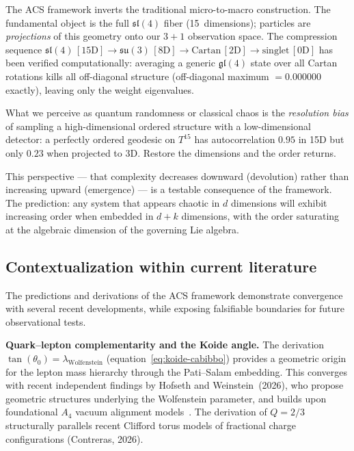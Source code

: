 \documentclass[11pt,a4paper]{article}
\theoremstyle{plain}
\theoremstyle{definition}
\theoremstyle{remark}
\begin{document}
The ACS framework inverts the traditional micro-to-macro construction.
The fundamental object is the full $\mathfrak{sl}(4)$ fiber (15~dimensions);
particles are \emph{projections} of this geometry onto our $3{+}1$
observation space.  The compression sequence
$\mathfrak{sl}(4)\,[15\mathrm{D}] \to \mathfrak{su}(3)\,[8\mathrm{D}]
\to \mathrm{Cartan}\,[2\mathrm{D}] \to \mathrm{singlet}\,[0\mathrm{D}]$
has been verified computationally:  averaging a generic $\mathfrak{gl}(4)$
state over all Cartan rotations kills all off-diagonal structure
(off-diagonal maximum $= 0.000000$ exactly), leaving only the weight
eigenvalues.

What we perceive as quantum randomness or classical chaos is the
\emph{resolution bias} of sampling a high-dimensional ordered structure
with a low-dimensional detector: a perfectly ordered geodesic on $T^{15}$
has autocorrelation $0.95$ in 15D but only $0.23$ when projected to 3D.
Restore the dimensions and the order returns.

This perspective --- that complexity decreases downward (devolution)
rather than increasing upward (emergence) --- is a testable consequence
of the framework.  The prediction: any system that appears chaotic in
$d$ dimensions will exhibit increasing order when embedded in $d + k$
dimensions, with the order saturating at the algebraic dimension of
the governing Lie algebra.

\subsection{Contextualization within current literature}
\label{sec:literature_context}

The predictions and derivations of the ACS framework demonstrate
convergence with several recent developments, while exposing
falsifiable boundaries for future observational tests.

\textbf{Quark--lepton complementarity and the Koide angle.}
The derivation $\tan(\theta_0) = \lambda_{\mathrm{Wolfenstein}}$
(equation~\eqref{eq:koide-cabibbo}) provides a geometric origin for
the lepton mass hierarchy through the Pati--Salam embedding.
This converges with recent independent findings by
Hofseth and Weinstein~(2026), who propose geometric structures
underlying the Wolfenstein parameter, and builds upon foundational
$A_4$ vacuum alignment models~\cite{King2014}.
The derivation of $Q = 2/3$ structurally parallels recent
Clifford torus models of fractional charge configurations
(Contreras, 2026).
\end{document}
